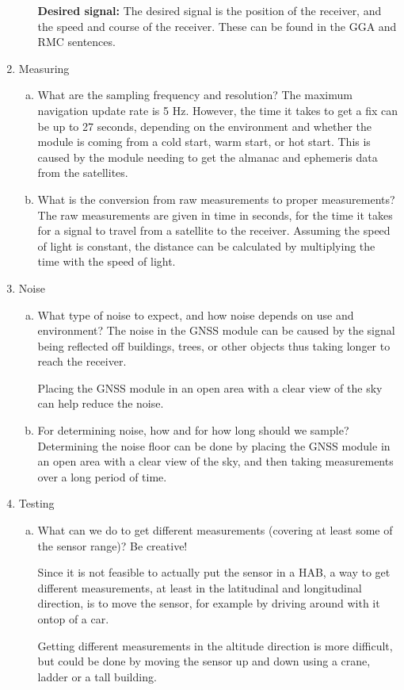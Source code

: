 \begin{enumerate}
\begin{enumerate}[(a)]
        \textbf{Desired signal:}
        The desired signal is the position of the receiver, and the speed and course of the receiver.
        These can be found in the GGA and RMC sentences.%
    \end{enumerate}
    \item Measuring
    \begin{enumerate}[(a)]
        \item What are the sampling frequency and resolution?
        The maximum navigation update rate is 5 Hz. %
        However, the time it takes to get a fix can be up to 27 seconds, depending on the environment and whether the module is coming from a cold start, warm start, or hot start.
        This is caused by the module needing to get the almanac and ephemeris data from the satellites.

        \item What is the conversion from raw measurements to proper measurements?
        The raw measurements are given in time in seconds, for the time it takes for a signal to travel from a satellite to the receiver.
        Assuming the speed of light is constant, the distance can be calculated by multiplying the time with the speed of light.

    \end{enumerate}
    \item Noise
    \begin{enumerate}[(a)]
        \item What type of noise to expect, and how noise depends on use and environment?
        The noise in the GNSS module can be caused by the signal being reflected off buildings, trees, or other objects thus taking longer to reach the receiver.

        Placing the GNSS module in an open area with a clear view of the sky can help reduce the noise.


        \item For determining noise, how and for how long should we sample?
        Determining the noise floor can be done by placing the GNSS module in an open area with a clear view of the sky, and then taking measurements over a long period of time.

    \end{enumerate}
    \item Testing
    \begin{enumerate}[(a)]
        \item What can we do to get different measurements (covering at least some of the sensor range)? Be creative!

        Since it is not feasible to actually put the sensor in a HAB, a way to get different measurements, at least in the latitudinal and longitudinal direction, is to move the sensor, for example by driving around with it ontop of a car.

        Getting different measurements in the altitude direction is more difficult, but could be done by moving the sensor up and down using a crane, ladder or a tall building.
    \end{enumerate}
\end{enumerate}






